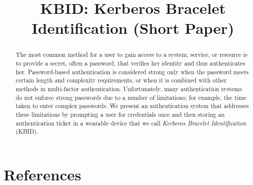 \documentclass[runningheads,a4paper]{llncs}
\begin{document}
%

\title{KBID: Kerberos Bracelet Identification (Short Paper)}


%

			
\maketitle

\begin{abstract}
The most common method for a user to gain access to a system, service, or resource is to provide a secret, often a password, that verifies her identity and thus authenticates her. Password-based authentication is considered strong only when the password meets certain length and complexity requirements, or when it is combined with other methods in multi-factor authentication. Unfortunately, many authentication systems do not enforce strong passwords due to a number of limitations; for example, the time taken to enter complex passwords. We present an authentication system that addresses these limitations by prompting a user for credentials once and then storing an authentication ticket in a wearable device that we call \textit{Kerberos Bracelet Identification} (KBID).  
\end{abstract}










\section{References}\label{sec:references}





\end{document}
